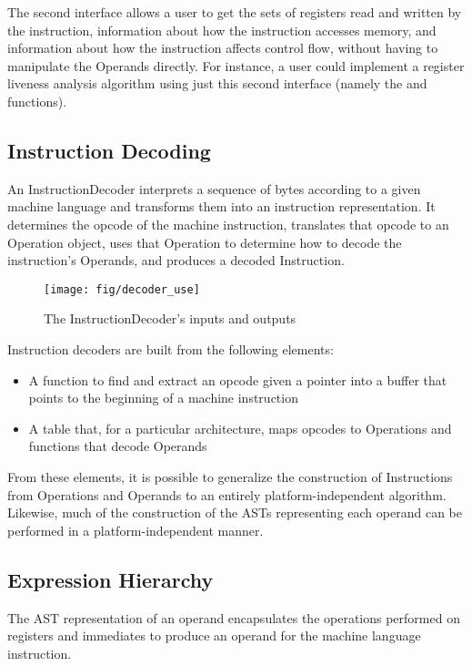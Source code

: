 The second interface allows a user to get the sets of registers read and written
by the instruction, information about how the instruction accesses memory, and
information about how the instruction affects control flow, without having to
manipulate the Operands directly. For instance, a user could implement a
register liveness analysis algorithm using just this second interface (namely
the  and  functions).

\subsection{Instruction Decoding}

An InstructionDecoder interprets a sequence of bytes according to a given
machine language and transforms them into an instruction representation. It
determines the opcode of the machine instruction, translates that opcode to an
Operation object, uses that Operation to determine how to decode the
instruction's Operands, and produces a decoded Instruction.

\begin{figure}
    \centering
    \texttt{[image: fig/decoder\_use]}
\caption{The InstructionDecoder's inputs and outputs}
\label{fig:decoder-use}
\end{figure}
 
Instruction decoders are built from the following elements:

\begin{itemize}
\item A function to find and extract an opcode given a pointer into a buffer that points to the beginning of a machine instruction
\item A table that, for a particular architecture, maps opcodes to Operations and functions that decode Operands
\end{itemize}

From these elements, it is possible to generalize the construction of
Instructions from Operations and Operands to an entirely platform-\/independent
algorithm. Likewise, much of the construction of the ASTs representing each
operand can be performed in a platform-\/independent manner. 

\subsection{Expression Hierarchy}
\label{subsec:hierarchy}

The AST representation of an operand encapsulates the operations performed on
registers and immediates to produce an operand for the machine language
instruction.

